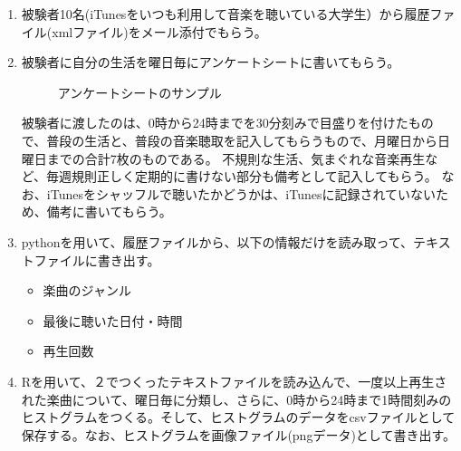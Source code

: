 \documentclass[11pt, twocolumn]{jsarticle}
\begin{document}
\begin{enumerate}
\item
被験者10名(iTunesをいつも利用して音楽を聴いている大学生）から履歴ファイル(xmlファイル)をメール添付でもらう。

\item
被験者に自分の生活を曜日毎にアンケートシートに書いてもらう。
\begin{figure}[htbp]
\begin{center}
\caption{アンケートシートのサンプル}
\end{center}
\end{figure}

被験者に渡したのは、0時から24時までを30分刻みで目盛りを付けたもので、普段の生活と、普段の音楽聴取を記入してもらうもので、月曜日から日曜日までの合計7枚のものである。
不規則な生活、気まぐれな音楽再生など、毎週規則正しく定期的に書けない部分も備考として記入してもらう。
なお、iTunesをシャッフルで聴いたかどうかは、iTunesに記録されていないため、備考に書いてもらう。
\item
pythonを用いて、履歴ファイルから、以下の情報だけを読み取って、テキストファイルに書き出す。
\begin{itemize}
\item
楽曲のジャンル
\item
最後に聴いた日付・時間
\item
再生回数
\end{itemize}

\item
Rを用いて、２でつくったテキストファイルを読み込んで、一度以上再生された楽曲について、曜日毎に分類し、さらに、0時から24時まで1時間刻みのヒストグラムをつくる。そして、ヒストグラムのデータをcsvファイルとして保存する。なお、ヒストグラムを画像ファイル(pngデータ)として書き出す。


\end{enumerate}
\end{document}
